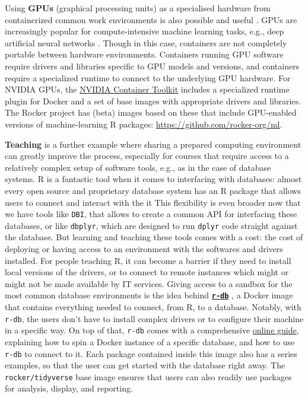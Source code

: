 Using \textbf{GPUs} (graphical processing units) as a specialised
hardware from containerized common work environments is also possible
and useful \citep{haydel_enhancing_2015}. GPUs are increasingly popular
for compute-intensive machine learning tasks, e.g., deep artificial
neural networks \citep{schmidhuber_deep_2015}. Though in this case,
containers are not completely portable between hardware environments.
Containers running GPU software require drivers and libraries specific
to GPU models and versions, and containers require a specialized runtime
to connect to the underlying GPU hardware. For NVIDIA GPUs, the
\href{https://github.com/NVIDIA/nvidia-docker}{NVIDIA Container Toolkit}
includes a specialized runtime plugin for Docker and a set of base
images with appropriate drivers and libraries. The Rocker project has
(beta) images based on these that include GPU-enabled versions of
machine-learning R packages: \url{https://github.com/rocker-org/ml}.

\textbf{Teaching} is a further example where sharing a prepared
computing environment can greatly improve the process, especially for
courses that require access to a relatively complex setup of software
tools, e.g., as in the case of database systems. R is a fantastic tool
when it comes to interfacing with databases: almost every open source
and proprietary database system has an R package that allows users to
connect and interact with the it This flexibility is even broader now
that we have tools like \texttt{DBI}, that allows to create a common API
for interfacing these databases, or like \texttt{dbplyr}, which are
designed to run \texttt{dplyr} code straight against the database. But
learning and teaching these tools comes with a cost: the cost of
deploying or having access to an environment with the softwares and
drivers installed. For people teaching R, it can become a barrier if
they need to install local versions of the drivers, or to connect to
remote instances which might or might not be made available by IT
services. Giving access to a sandbox for the most common database
environments is the idea behind
\textbf{\href{https://github.com/ColinFay/r-db}{\texttt{r-db}}}
\citep{ColinFay}, a Docker image that contains everything needed to
connect, from R, to a database. Notably, with \texttt{r-db}, the users
don't have to install complex drivers or to configure their machine in a
specific way. On top of that, \texttt{r-db} comes with a comprehensive
\href{http://colinfay.me/r-db/}{online guide}, explaining how to spin a
Docker instance of a specific database, and how to use \texttt{r-db} to
connect to it. Each package contained inside this image also has a
series examples, so that the user can get started with the database
right away. The \texttt{rocker/tidyverse} base image ensures that users
can also readily use packages for analysis, display, and reporting.

